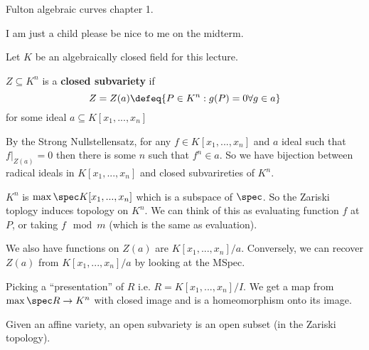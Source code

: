 \section{}
Fulton algebraic curves chapter 1.
\begin{remark}
    I am just a child please be nice to me on the midterm.
\end{remark}

\begin{notation}
    Let $K$ be an algebraically closed field for this lecture.
\end{notation}

{
$Z\subseteq K^n$ is a \textbf{closed subvariety} if \[Z=Z(a)\defeq \{P\in K^n: g(P)=0\forall g\in a\}\] 
 for some ideal $a \subseteq K[x_1,...,x_n]$
}
\begin{remark}
    By the Strong Nullstellensatz, for any $f\in K[x_1,...,x_n]$ and $a$ ideal such that $f|_{Z(a)}=0$ then there is some $n$ such that $f^n\in a$. So we have bijection between radical ideals in $K[x_1,...,x_n]$ and closed subvarireties of $K^n$. 
\end{remark}

$K^n$ is $\max \spec K[x_1,...,x_n]$ which is a subspace of $\spec$. So the Zariski toplogy induces topology on $K^n$. We can think of this as evaluating function $f$ at $P$, or taking $f\mod m$ (which is the same as evaluation).


We also have functions on $Z(a)$ are $K[x_1,...,x_n]/a$. Conversely, we can recover $Z(a)$ from $K[x_1,...,x_n]/a$ by looking at the MSpec. 

\begin{remark}
    Picking a ``presentation'' of $R$ i.e. $R=K[x_1,...,x_n]/I$. We get a map from $\max\spec R \to K^n$ with closed image and is a homeomorphism onto its image. 
\end{remark}

Given an affine variety, an open subvariety is an open subset (in the Zariski topology).


